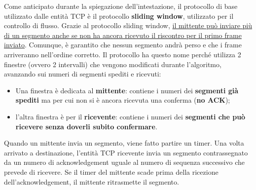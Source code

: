 \documentclass{article}
\begin{document}
        Come anticipato durante la spiegazione dell’intestazione, il protocollo di base utilizzato dalle
        entità TCP è il protocollo \textbf{sliding window}, utilizzato per il controllo di flusso. Grazie al
        protocollo sliding window, \underline{il mittente può inviare più di un segmento anche se non ha ancora
        ricevuto il riscontro per il primo frame inviato}. Comunque, è garantito che nessun segmento
        andrà perso e che i frame arriveranno nell’ordine corretto. Il protocollo ha questo nome
        perché utilizza 2 finestre (ovvero 2 intervalli) che vengono modificati durante l’algoritmo,
        avanzando sui numeri di segmenti spediti e ricevuti:
        \begin{itemize}
            \item Una finestra è dedicata al \textbf{mittente}: contiene i numeri dei \textbf{segmenti già spediti} ma per
            cui non si è ancora ricevuta una conferma (\textbf{no ACK});
            \item l’altra finestra è per il \textbf{ricevente}: contiene i numeri dei \textbf{segmenti che può ricevere
        senza doverli subito confermare}.
        \end{itemize}
        Quando un mittente invia un segmento, viene fatto partire un timer. Una volta arrivato a
        destinazione, l’entità TCP ricevente invia un segmento contrassegnato da un numero di
        acknowledgement uguale al numero di sequenza successivo che prevede di ricevere. Se il timer
        del mittente scade prima della ricezione dell’acknowledgement, il mittente ritrasmette il
        segmento.\\
\end{document}
